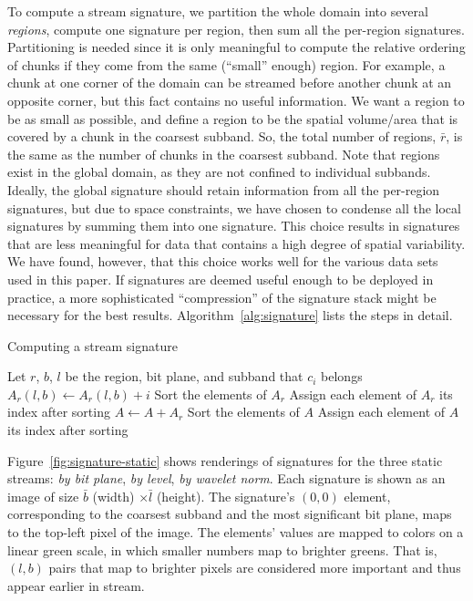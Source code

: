 To compute a stream signature, we partition the whole domain into several \emph{regions}, compute
one signature per region, then sum all the per-region signatures. Partitioning is needed since it is
only meaningful to compute the relative ordering of chunks if they come from the same (``small''
enough) region. For example, a chunk at one corner of the domain can be streamed before another
chunk at an opposite corner, but this fact contains no useful information. We want a region to be as
small as possible, and define a region to be the spatial volume/area that is covered by a chunk in
the coarsest subband. So, the total number of regions, $\bar{r}$, is the same as the number of
chunks in the coarsest subband. Note that regions exist in the global domain, as they are not
confined to individual subbands. Ideally, the global signature should retain information from all
the per-region signatures, but due to space constraints, we have chosen to condense all the local
signatures by summing them into one signature. This choice results in signatures that are less
meaningful for data that contains a high degree of spatial variability. We have found, however, that
this choice works well for the various data sets used in this paper. If signatures are deemed useful
enough to be deployed in practice, a more sophisticated ``compression'' of the signature stack might
be necessary for the best results. Algorithm~\ref{alg:signature} lists the steps in detail.

\begin{algorithm}[h]
  \caption{Computing a stream signature}
  \begin{algorithmic}[1]
			\State Let $r$, $b$, $l$ be the region, bit plane, and subband that $c_i$ belongs
			\State $A_r(l,b) \gets A_r(l,b)+i$
		\EndFor
			\State Sort the elements of $A_r$
			\State Assign each element of $A_r$ its index after sorting
			\State $A \gets A+A_r$
		\EndFor
		\State Sort the elements of $A$
		\State Assign each element of $A$ its index after sorting
	\end{algorithmic}
	\label{alg:signature}
\end{algorithm}

Figure~\ref{fig:signature-static} shows renderings of signatures for the three static streams:
\emph{by bit plane}, \emph{by level}, \emph{by wavelet norm}. Each signature is shown as an image of
size $\bar{b}$ (width) $\times \bar{l}$ (height). The signature's $(0,0)$ element, corresponding to
the coarsest subband and the most significant bit plane, maps to the top-left pixel of the image.
The elements' values are mapped to colors on a linear green scale, in which smaller numbers map to
brighter greens. That is, $(l,b)$ pairs that map to brighter pixels are considered more important
and thus appear earlier in stream.

